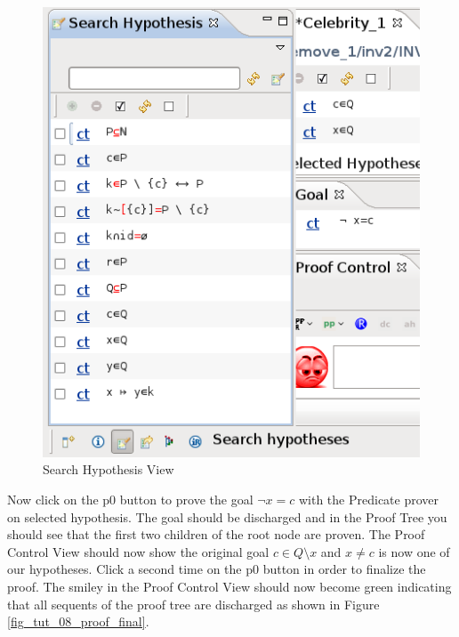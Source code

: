 \begin{figure}[!ht]
\begin{center}
	\includegraphics{img/tutorial/tut_08_search_hypothesis.png}
	\caption{Search Hypothesis View}
	\label{fig_tut_08_search_hypothesis}
\end{center}
\end{figure}

Now click on the \textsf{p0} button to prove the goal $\lnot x = c$ with the \textsf{Predicate prover on selected hypothesis}. The goal should be discharged and in the Proof Tree you should see that the first two children of the root node are proven. The \textsf{Proof Control View} should now show the original goal $c \in Q \setminus {x}$ and $x\neq c$ is now one of our hypotheses. Click a second time on the \textsf{p0} button in order to finalize the proof. The smiley in the \textsf{Proof Control View} should now become green indicating that all sequents of the proof tree are discharged as shown in Figure \ref{fig_tut_08_proof_final}.

